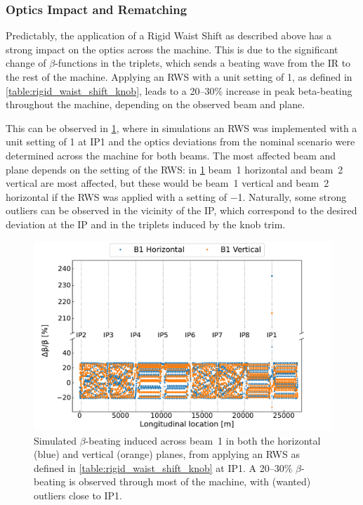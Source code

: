 \subsubsection*{Optics Impact and Rematching}

Predictably, the application of a Rigid Waist Shift as described above has a strong impact on the optics across the machine.
This is due to the significant change of \(\beta\)-functions in the triplets, which sends a beating wave from the IR to the rest of the machine.
Applying an RWS with a unit setting of \num{1}, as defined in \cref{table:rigid_waist_shift_knob}, leads to a \numrange[range-phrase = --]{20}{30}\unit{\percent} increase in peak \gls{beta-beating} throughout the machine, depending on the observed beam and plane.

This can be observed in \cref{figure:rigid_waist_shift_betabeating}, where in simulations an RWS was implemented with a unit setting of \num{1} at IP\num{1} and the optics deviations from the nominal scenario were determined across the machine for both beams.
The most affected beam and plane depends on the setting of the RWS: in \cref{figure:rigid_waist_shift_betabeating} beam~\num{1} horizontal and beam~\num{2} vertical are most affected, but these would be beam~\num{1} vertical and beam~\num{2} horizontal if the RWS was applied with a setting of \num{-1}.
Naturally, some strong outliers can be observed in the vicinity of the IP, which correspond to the desired deviation at the IP and in the triplets induced by the \gls{knob} \gls{trim}.
\break

\begin{figure}[!htb]
    \centering
    \includegraphics[width=\textwidth]{Figures/IR_Coupling_Correction/rws_ir1_b1_bbeating.pdf}
    \caption{Simulated \(\beta\)-beating induced across beam~\num{1} in both the horizontal (\textcolor{mplblue}{blue}) and vertical (\textcolor{mplorange}{orange}) planes, from applying an RWS as defined in \cref{table:rigid_waist_shift_knob} at IP\num{1}. A \numrange{20}{30}\unit{\percent} \(\beta\)-beating is observed through most of the machine, with (wanted) outliers close to IP\num{1}.}
    \label{figure:rigid_waist_shift_betabeating}
\end{figure}

